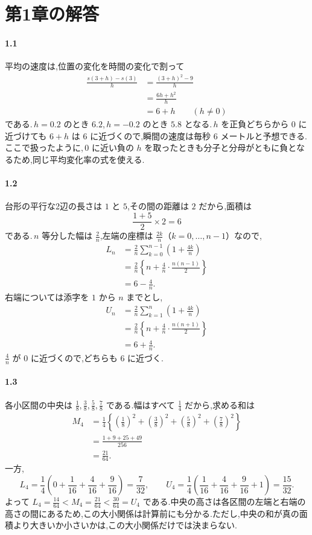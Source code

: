 \section{第1章の解答}\label{解答:第1章}
\paragraph{1.1}
平均の速度は,位置の変化を時間の変化で割って
\begin{align*}
 \frac{s(3+h)-s(3)}h
 &=\frac{(3+h)^2-9}{h}\\
 &=\frac{6h+h^2}{h}\\
 &=6+h \qquad(h\ne0)
\end{align*}
である.\,$h=0.2$ のとき $6.2$,\,$h=-0.2$ のとき $5.8$ となる.\,$h$ を正負どちらから $0$ に近づけても $6+h$ は $6$ に近づくので,瞬間の速度は毎秒 $6$ メートルと予想できる.ここで扱ったように,\,$0$ に近い負の $h$ を取ったときも分子と分母がともに負となるため,同じ平均変化率の式を使える.

\paragraph{1.2}
台形の平行な2辺の長さは $1$ と $5$,その間の距離は $2$ だから,面積は
\[
 \frac{1+5}{2}\times2=6
\]
である.\,$n$ 等分した幅は $\frac2n$,左端の座標は $\frac{2k}{n}$（$k=0,\ldots,n-1$）なので,
\begin{align*}
 L_n
 &=\frac2n\sum_{k=0}^{n-1}\left(1+\frac{4k}{n}\right)\\
 &=\frac2n\left\{n+\frac4n\cdot\frac{n(n-1)}2\right\}\\
 &=6-\frac4n.
\end{align*}
右端については添字を $1$ から $n$ までとし,
\begin{align*}
 U_n
 &=\frac2n\sum_{k=1}^{n}\left(1+\frac{4k}{n}\right)\\
 &=\frac2n\left\{n+\frac4n\cdot\frac{n(n+1)}2\right\}\\
 &=6+\frac4n.
\end{align*}
$\frac4n$ が $0$ に近づくので,どちらも $6$ に近づく.

\paragraph{1.3}
各小区間の中央は $\frac18,\frac38,\frac58,\frac78$ である.幅はすべて $\frac14$ だから,求める和は
\begin{align*}
 M_4&=\frac14\left\{\left(\frac18\right)^2
 +\left(\frac38\right)^2+\left(\frac58\right)^2
 +\left(\frac78\right)^2\right\}\\
 &=\frac{1+9+25+49}{256}\\
 &=\frac{21}{64}.
\end{align*}
一方,
\[
 L_4=\frac14\left(0+\frac1{16}+\frac4{16}+\frac9{16}\right)=\frac7{32},
 \qquad
 U_4=\frac14\left(\frac1{16}+\frac4{16}+\frac9{16}+1\right)=\frac{15}{32}.
\]
よって $L_4=\frac{14}{64}<M_4=\frac{21}{64}<\frac{30}{64}=U_4$ である.中央の高さは各区間の左端と右端の高さの間にあるため,この大小関係は計算前にも分かる.ただし,中央の和が真の面積より大きいか小さいかは,この大小関係だけでは決まらない.

